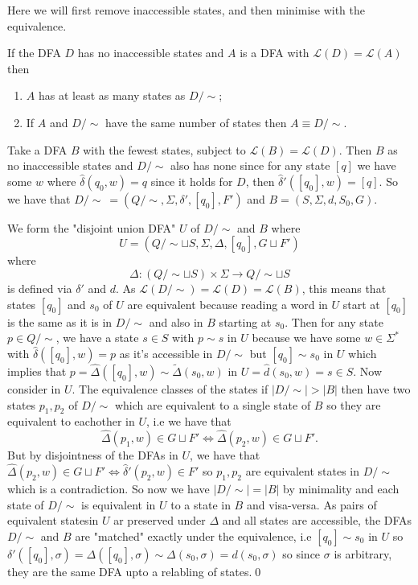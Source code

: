 \documentclass[tikx, border = 10pt]{article}
\begin{document}
Here we will first remove inaccessible states, and then minimise with the equivalence.
\begin{theorem}
  If the DFA $ D $ has no inaccessible states and $ A $ is a DFA with $ \mathcal L(D) = \mathcal L(A) $ then
  \begin{enumerate}
	  \item $ A $ has at least as many states as $ D/\sim $;
	  \item If $ A $ and $ D/\sim $ have the same number of states then $ A\equiv D/\sim $.
  \end{enumerate}
\end{theorem}
\pf Take a DFA $ B $ with the fewest states, subject to $ \mathcal L(B) = \mathcal L(D) $. Then $ B $ as no inaccessible states and $ D/\sim $ also has none since for any state $ [q] $ we have some $ w $ where $ \hat\delta(q_0,w)=q $ since it holds for $ D $, then $ \hat\delta'([q_0],w) = [q] $. So we have that $ D/\sim\  = (Q/\sim, \Sigma,\delta', [q_0], F') $ and $ B=(S,\Sigma, d,S_0,G) $. \par
We form the "disjoint union DFA" $ U $ of $ D/\sim $ and $ B $ where
\[
	U = (Q/\sim\sqcup S, \Sigma, \Delta, [q_0], G\sqcup F')
\]
where
\[
  \Delta:(Q/\sim \sqcup S)\times \Sigma \to Q/\sim \sqcup S
\]
is defined via $ \delta' $ and $ d $. As $ \mathcal L(D/\sim) = \mathcal L(D) = \mathcal L(B) $, this means that states $ [q_0] $ and $ s_0 $ of $ U $ are equivalent because reading a word in $ U $ start at $ [q_0] $ is the same as it is in $ D/\sim $ and also in $ B $ starting at $ s_0 $. Then for any state $ p\in Q/\sim $, we have a state $ s\in S $ with $ p\sim s $ in $ U $ because we have some $ w\in \Sigma^* $ with $ \hat\delta([q_0],w) = p $ as it's accessible in $ D/\sim $ but $ [q_0]\sim s_0 $ in $ U $ which implies that $ p = \hat \Delta([q_0],w) \sim \tilde \Delta(s_0,w) $ in $ U=\hat d(s_0,w)=s\in S $. Now consider in $ U $. The equivalence classes of the states if $ |D/\sim |>|B| $ then have two states $ p_1,p_2 $ of $ D/\sim $ which are equivalent to a single state of $ B $ so they are equivalent to eachother in $ U $, i.e we have that
\[
  \hat \Delta(p_1,w)\in G\sqcup F' \iff \hat\Delta(p_2,w)\in G\sqcup F'.
\]
But by disjointness of the DFAs in $ U $, we have that $ \hat\Delta(p_2,w)\in G\sqcup F'\iff \hat\delta'(p_2,w)\in F' $ so $ p_1,p_2 $ are equivalent states in $ D/\sim $ which is a contradiction. So now we have $ |D/\sim|=|B| $ by minimality and each state of $ D/\sim $ is equivalent in $ U $ to a state in $ B $ and visa-versa. As pairs of equivalent statesin $ U $ ar preserved under $ \Delta $ and all states are accessible, the DFAs $ D/\sim $ and $ B $ are "matched" exactly under the equivalence, i.e $ [q_0]\sim s_0 $ in $ U $ so $ \delta'([q_0],\sigma) = \Delta([q_0], \sigma) \sim\Delta(s_0,\sigma)=d(s_0,\sigma) $ so since $ \sigma $ is arbitrary, they are the same DFA upto a relabling of states.\qed
\end{document}
